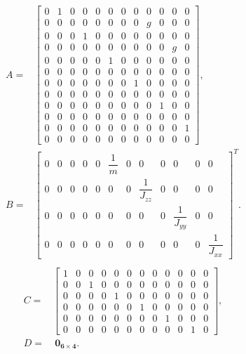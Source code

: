 \begin{align}
\begin{split}
A = & 
\begin{bmatrix}
0 & 1 & 0 & 0 & 0 & 0 & 0 & 0 & 0 & 0 & 0 & 0\\[2px]
0 & 0 & 0 & 0 & 0 & 0 & 0 & 0 & g & 0 & 0 & 0\\[2px]
0 & 0 & 0 & 1 & 0 & 0 & 0 & 0 & 0 & 0 & 0 & 0\\[2px]
0 & 0 & 0 & 0 & 0 & 0 & 0 & 0 & 0 & 0 & g & 0\\[2px]
0 & 0 & 0 & 0 & 0 & 1 & 0 & 0 & 0 & 0 & 0 & 0\\[2px]
0 & 0 & 0 & 0 & 0 & 0 & 0 & 0 & 0 & 0 & 0 & 0\\[2px]
0 & 0 & 0 & 0 & 0 & 0 & 0 & 1 & 0 & 0 & 0 & 0\\[2px]
0 & 0 & 0 & 0 & 0 & 0 & 0 & 0 & 0 & 0 & 0 & 0\\[2px]
0 & 0 & 0 & 0 & 0 & 0 & 0 & 0 & 0 & 1 & 0 & 0\\[2px]
0 & 0 & 0 & 0 & 0 & 0 & 0 & 0 & 0 & 0 & 0 & 0\\[2px]
0 & 0 & 0 & 0 & 0 & 0 & 0 & 0 & 0 & 0 & 0 & 1\\[2px]
0 & 0 & 0 & 0 & 0 & 0 & 0 & 0 & 0 & 0 & 0 & 0
\end{bmatrix}, \\[15px]
B = & 
\begin{bmatrix}
0 & 0 & 0 & 0 & 0 & \dfrac{1}{m} & 0 & 0 & 0 & 0 & 0 & 0\\[5px]
0 & 0 & 0 & 0 & 0 & 0 & 0 & \dfrac{1}{J_{zz}} & 0 & 0 & 0 & 0\\[5px]
0 & 0 & 0 & 0 & 0 & 0 & 0 & 0 & 0 & \dfrac{1}{J_{yy}} & 0 & 0\\[5px]
0 & 0 & 0 & 0 & 0 & 0 & 0 & 0 & 0 & 0 & 0 & \dfrac{1}{J_{xx}}
\end{bmatrix}^{T}.
\end{split}
\end{align}
\begin{align}
\begin{split}
C = & 
\begin{bmatrix}
1 & 0 & 0 & 0 & 0 & 0 & 0 & 0 & 0 & 0 & 0 & 0 \\[2px]
0 & 0 & 1 & 0 & 0 & 0 & 0 & 0 & 0 & 0 & 0 & 0 \\[2px]
0 & 0 & 0 & 0 & 1 & 0 & 0 & 0 & 0 & 0 & 0 & 0 \\[2px]
0 & 0 & 0 & 0 & 0 & 0 & 1 & 0 & 0 & 0 & 0 & 0 \\[2px]
0 & 0 & 0 & 0 & 0 & 0 & 0 & 0 & 1 & 0 & 0 & 0 \\[2px]
0 & 0 & 0 & 0 & 0 & 0 & 0 & 0 & 0 & 0 & 1 & 0
\end{bmatrix}, \\[15px]
D = &\ \mathbf{0_{6\times 4}}.
\end{split}
\end{align}
